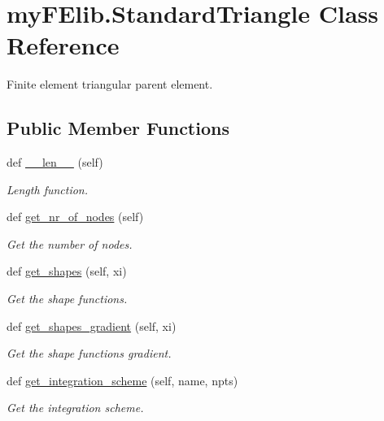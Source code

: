 \hypertarget{classmyFElib_1_1StandardTriangle}{}\section{my\+F\+Elib.\+Standard\+Triangle Class Reference}
\label{classmyFElib_1_1StandardTriangle}


Finite element triangular parent element.  


\subsection*{Public Member Functions}
\begin{DoxyCompactItemize}
\item 
\mbox{\label{classmyFElib_1_1StandardTriangle_a2efe2a80fc454944ddf9eeb88b4d6c2e}} 
def \mbox{\hyperlink{classmyFElib_1_1StandardTriangle_a2efe2a80fc454944ddf9eeb88b4d6c2e}{\+\_\+\+\_\+len\+\_\+\+\_\+}} (self)
\begin{DoxyCompactList}\small\item\em Length function. \end{DoxyCompactList}\item 
\mbox{\label{classmyFElib_1_1StandardTriangle_a6d6e7ed7d74740180f1b6e8a1a094d6c}} 
def \mbox{\hyperlink{classmyFElib_1_1StandardTriangle_a6d6e7ed7d74740180f1b6e8a1a094d6c}{get\+\_\+nr\+\_\+of\+\_\+nodes}} (self)
\begin{DoxyCompactList}\small\item\em Get the number of nodes. \end{DoxyCompactList}\item 
def \mbox{\hyperlink{classmyFElib_1_1StandardTriangle_a374be169ec06f9e1ea1ce6664275e9f6}{get\+\_\+shapes}} (self, xi)
\begin{DoxyCompactList}\small\item\em Get the shape functions. \end{DoxyCompactList}\item 
def \mbox{\hyperlink{classmyFElib_1_1StandardTriangle_abb8220126b3749be519c838a2a8a55e8}{get\+\_\+shapes\+\_\+gradient}} (self, xi)
\begin{DoxyCompactList}\small\item\em Get the shape functions gradient. \end{DoxyCompactList}\item 
def \mbox{\hyperlink{classmyFElib_1_1StandardTriangle_ac825bfb18ff9df609d79746ce27f7535}{get\+\_\+integration\+\_\+scheme}} (self, name, npts)
\begin{DoxyCompactList}\small\item\em Get the integration scheme. \end{DoxyCompactList}\end{DoxyCompactItemize}


